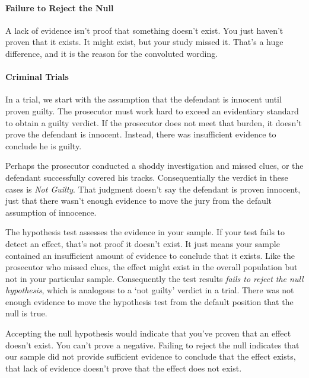 \documentclass[11pt]{article}
\begin{document}
\hypertarget{failure-to-reject-the-null}{%
\paragraph{Failure to Reject the Null}\label{failure-to-reject-the-null}}

A lack of evidence isn't proof that something doesn't exist. You just
haven't proven that it exists. It might exist, but your study missed it.
That's a huge difference, and it is the reason for the convoluted
wording.




\hypertarget{criminal-trials}{%
\paragraph{Criminal Trials}\label{criminal-trials}}

In a trial, we start with the assumption that the defendant is innocent
until proven guilty. The prosecutor must work hard to exceed an
evidentiary standard to obtain a guilty verdict. If the prosecutor does
not meet that burden, it doesn't prove the defendant is innocent.
Instead, there was insufficient evidence to conclude he is guilty.

Perhaps the prosecutor conducted a shoddy investigation and missed
clues, or the defendant successfully covered his tracks. Consequentially
the verdict in these cases is \emph{Not Guilty}. That judgment doesn't
say the defendant is proven innocent, just that there wasn't enough
evidence to move the jury from the default assumption of innocence.

The hypothesis test assesses the evidence in your sample. If your test
fails to detect an effect, that's not proof it doesn't exist. It just
means your sample contained an insufficient amount of evidence to
conclude that it exists. Like the prosecutor who missed clues, the
effect might exist in the overall population but not in your particular
sample. Consequently the test results \emph{fails to reject the null
hypothesis}, which is analogous to a `not guilty' verdict in a trial.
There was not enough evidence to move the hypothesis test from the
default position that the null is true.

Accepting the null hypothesis would indicate that you've proven that an
effect doesn't exist. You can't prove a negative. Failing to reject the
null indicates that our sample did not provide sufficient evidence to
conclude that the effect exists, that lack of evidence doesn't prove
that the effect does not exist.
\end{document}
